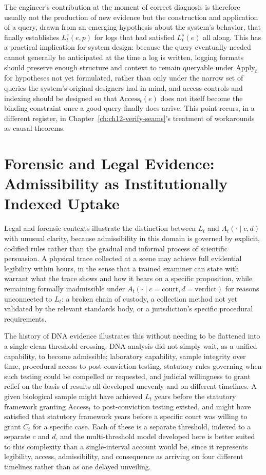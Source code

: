 The engineer's contribution at the moment of correct diagnosis is therefore usually not the production of new evidence but the construction and application of a query, drawn from an emerging hypothesis about the system's behavior, that finally establishes $L^e_t(e,p)$ for logs that had satisfied $L^s_t(e)$ all along. This has a practical implication for system design: because the query eventually needed cannot generally be anticipated at the time a log is written, logging formats should preserve enough structure and context to remain queryable under $\mathrm{Apply}_t$ for hypotheses not yet formulated, rather than only under the narrow set of queries the system's original designers had in mind, and access controls and indexing should be designed so that $\mathrm{Access}_t(e)$ does not itself become the binding constraint once a good query finally does arrive. This point recurs, in a different register, in Chapter~\ref{ch:ch12-verify-seams}'s treatment of workarounds as causal theorems.

\section{Forensic and Legal Evidence: Admissibility as Institutionally Indexed Uptake}

Legal and forensic contexts illustrate the distinction between $L_t$ and $A_t(\cdot \mid c,d)$ with unusual clarity, because admissibility in this domain is governed by explicit, codified rules rather than the gradual and informal process of scientific persuasion. A physical trace collected at a scene may achieve full evidential legibility within hours, in the sense that a trained examiner can state with warrant what the trace shows and how it bears on a specific proposition, while remaining formally inadmissible under $A_t(\cdot \mid c=\text{court}, d=\text{verdict})$ for reasons unconnected to $L_t$: a broken chain of custody, a collection method not yet validated by the relevant standards body, or a jurisdiction's specific procedural requirements.

The history of DNA evidence illustrates this without needing to be flattened into a single clean threshold crossing. DNA analysis did not simply wait, as a unified capability, to become admissible; laboratory capability, sample integrity over time, procedural access to post-conviction testing, statutory rules governing when such testing could be compelled or requested, and judicial willingness to grant relief on the basis of results all developed unevenly and on different timelines. A given biological sample might have achieved $L_t$ years before the statutory framework granting $\mathrm{Access}_t$ to post-conviction testing existed, and might have satisfied that statutory framework years before a specific court was willing to grant $C_t$ for a specific case. Each of these is a separate threshold, indexed to a separate $c$ and $d$, and the multi-threshold model developed here is better suited to this complexity than a single-interval account would be, since it represents legibility, access, admissibility, and consequence as arriving on four different timelines rather than as one delayed unveiling.

